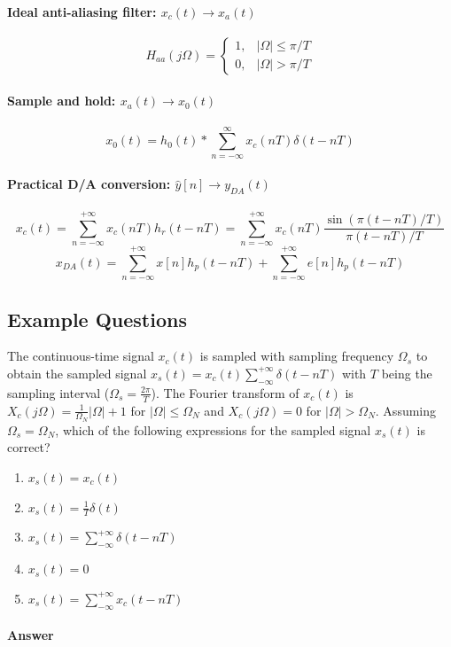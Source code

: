 \paragraph{Ideal anti-aliasing filter: $x_{c}(t) \to x_{a}(t)$}
\[
    H_{aa}(j\Omega) = 
    \begin{cases}
    1,  & \lvert \Omega \rvert \leq \pi/T \\
    0,  & \lvert \Omega \rvert > \pi/T
    \end{cases}
\]

\paragraph{Sample and hold: $x_{a}(t) \to x_{0}(t)$}
\[
    x_0(t) = h_0(t) * \sum_{n=-\infty}^{\infty} x_{c}(nT)\delta(t-nT)
\]

\paragraph{Practical D/A conversion: $\hat{y}[n] \to y_{DA}(t)$}
\[
    x_{c}(t) = \sum_{n=-\infty}^{+\infty} x_{c}(nT)h_{r}(t-nT) = \sum_{n=-\infty}^{+\infty} x_{c}(nT) \frac{\sin(\pi(t-nT)/T)}{\pi(t-nT)/T}
\]
\[
    x_{DA}(t) = \sum_{n=-\infty}^{+\infty} x[n]h_{p}(t-nT) + \sum_{n=-\infty}^{+\infty} e[n]h_{p}(t-nT)
\]

\subsection{Example Questions}
\begin{q}{}
The continuous-time signal $x_{c}(t)$ is sampled with sampling frequency $\Omega_{s}$ to obtain the sampled signal $x_{s}(t) = x_{c}(t) \sum_{-\infty}^{+\infty} \delta(t-nT)$ with $T$ being the sampling interval ($\Omega_s = \frac{2\pi}{T}$). The Fourier transform of $x_{c}(t)$ is $X_{c}(j\Omega) = \frac{1}{\Omega_{N}} \lvert \Omega \rvert + 1$ for $\lvert \Omega \rvert \leq \Omega_N$ and $X_{c}(j\Omega) = 0$ for $\lvert \Omega \rvert > \Omega_N$. Assuming $\Omega_{s} = \Omega_{N}$, which of the following expressions for the sampled signal $x_{s}(t)$ is correct? 

\begin{enumerate}[label=(\alph*)]
    \item $x_{s}(t) = x_{c}(t)$
    \item $x_{s}(t) = \frac{1}{T}\delta(t)$
    \item $x_{s}(t) = \sum_{-\infty}^{+\infty} \delta(t-nT)$
    \item $x_{s}(t) = 0$
    \item $x_{s}(t) = \sum_{-\infty}^{+\infty} x_{c}(t-nT)$
\end{enumerate}

\paragraph{Answer}

\end{q}


